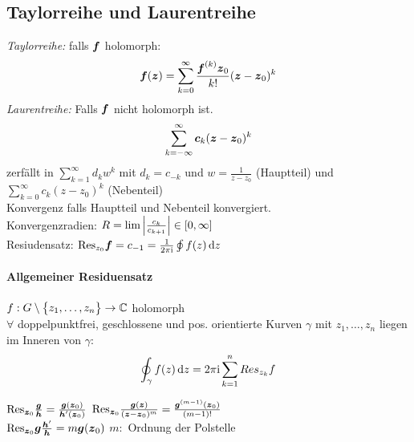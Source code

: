 \documentclass[german,color,6pt]{latex4ei/latex4ei_fs}
\begin{document}
\begin{sectionbox}
	\subsection{Taylorreihe und Laurentreihe}
	\emph{Taylorreihe:} falls $\boldsymbol{f}$ holomorph:\\
	\begin{equation*}
		\boldsymbol{f}(\boldsymbol{z}) = \sum\limits_{k = 0}^{\infty} \frac{\boldsymbol{f}^{(k)} \boldsymbol{z}_0}{k!} (\boldsymbol{z} - \boldsymbol{z}_0)^k
	\end{equation*}
	\emph{Laurentreihe:} Falls $\boldsymbol{f}$ nicht holomorph ist.\\
	\begin{equation*}
		\sum\limits_{k = -\infty}^\infty \boldsymbol{c}_k (\boldsymbol{z} - \boldsymbol{z}_0)^k
		\end{equation*}
	zerfällt in $\sum \limits_{k=1}^{\infty} d_k w^k$ mit $d_k = c_{-k}$ und $w = \frac{1}{z - z_0}$ (Hauptteil) und $\sum \limits_{k = 0}^{\infty} c_k (z-z_0)^k$ (Nebenteil) \\
	Konvergenz falls Hauptteil und Nebenteil konvergiert. \\ 
	Konvergenzradien: $R = \lim \left\vert\frac{c_k}{c_{k+1}}\right\vert \in [0, \infty]$ \\ 
	Resiudensatz: $\mathrm{Res}_{z_0} \cx f = c_{-1} = \frac{1}{2\pi\i} \oint f(z) \diff z$
	
	\paragraph{Allgemeiner Residuensatz} $f:G \setminus \bigl\{z_1, \ldots, z_n\bigr\} \rightarrow \mathbb C$ holomorph \\ 
	$\forall $ doppelpunktfrei, geschlossene und pos. orientierte Kurven $\gamma$ mit $z_1, \dots, z_n$ liegen im Inneren von $\gamma$:
	\begin{equation*}
		\oint_\gamma f(z) \diff z = 2 \pi \i \sum_{k=1}^{n} Res_{z_k} f
	\end{equation*}
	
	\begin{emphbox}
		\raggedright
		$\mathrm{Res}_{\boldsymbol{z}_0} \frac{\boldsymbol{g}}{\boldsymbol{h}} = \frac{\boldsymbol{g}(\boldsymbol{z}_0)}{\boldsymbol{h}'(\boldsymbol{z}_0)}$ \qquad $\mathrm{Res}_{\boldsymbol{z}_0} \frac{\boldsymbol{g}(\boldsymbol{z})}{(\boldsymbol{z} - \boldsymbol{z}_0)^m} = \frac{\boldsymbol{g}^{(m-1)}(\boldsymbol{z}_0)}{(m-1)!}$\\
		$\mathrm{Res}_{\boldsymbol{z}_0} \boldsymbol{g} \frac{\boldsymbol{h}'}{\boldsymbol{h}} = m \boldsymbol{g}(\boldsymbol{z}_0)$ \qquad $m:$ Ordnung der Polstelle
	\end{emphbox}
\end{sectionbox}
\end{document}
